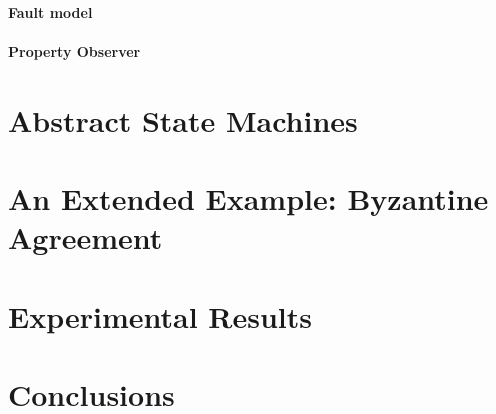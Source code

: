 \documentclass{IEEEtran/IEEEtran}
\begin{document}
\paragraph{Fault model}

\paragraph{Property Observer}

\section{Abstract State Machines}\label{sec:abstract}

\section{An Extended Example: Byzantine Agreement}\label{sec:byz}

\section{Experimental Results}\label{sec:experimental}

\section{Conclusions}\label{sec:conclusions}



\end{document}
